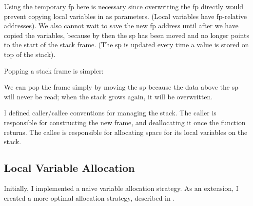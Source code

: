 \documentclass[00-main.tex]{subfiles}
\begin{document}
Using the temporary \gls{fp} here is necessary since overwriting the \gls{fp} directly would prevent copying local variables in as parameters.
(Local variables have \gls{fp}-relative addresses).
We also cannot wait to save the new \gls{fp} address until after we have copied the variables, because by then the \gls{sp} has been moved and no longer points to the start of the stack frame.
(The \gls{sp} is updated every time a value is stored on top of the stack).

Popping a stack frame is simpler:


We can pop the frame simply by moving the \gls{sp} because the data above the \gls{sp} will never be read; when the stack grows again, it will be overwritten.

I defined caller/callee conventions for managing the stack.
The caller is responsible for constructing the new frame, and deallocating it once the function returns.
The callee is responsible for allocating space for its local variables on the stack.


\subsection{Local Variable Allocation}\label{sec:impl:local variable allocation}

Initially, I implemented a naive variable allocation strategy.
As an extension, I created a more optimal allocation strategy, described in .
\end{document}
